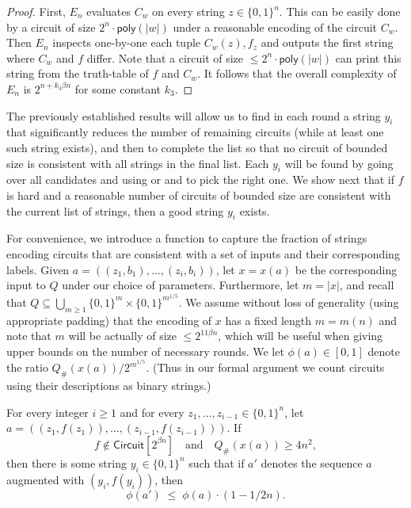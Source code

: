 \documentclass{toc}
\begin{document}
\begin{proof}
First, $E_n$ evaluates $C_w$ on every string $z \in \{0,1\}^n$. This can be easily done by a circuit of size $2^n \cdot \mathsf{poly}(|w|)$ under a reasonable encoding of the circuit $C_w$. Then $E_n$ inspects one-by-one each tuple $C_w(z), f_z$ and outputs the first string where $C_w$ and $f$ differ. Note that a circuit of size $\leq 2^n \cdot \mathsf{poly}(|w|)$ can print this string from the truth-table of $f$ and $C_w$. It follows that the overall complexity of $E_n$ is $2^{n + k_3 \beta n}$ for some constant $k_3$. 
\end{proof}

The previously established results will allow us to find in each round a string $y_i$ that significantly reduces the number of remaining circuits (while at least one such string exists), and then to complete the list so that no circuit of bounded size is consistent with all strings in the final list. Each $y_i$ will be found by going over all candidates and using  or  and  to pick the right one. We show next that if $f$ is hard and a reasonable number of circuits of bounded size are consistent with the current list of strings, then a good string $y_i$ exists.

For convenience, we introduce a function to capture the fraction of strings encoding circuits that are consistent with a set of inputs and their corresponding labels. Given $a = ((z_1, b_1), \ldots, (z_i, b_i))$, let $x = x(a)$ be the corresponding input to $Q$ under our choice of parameters. Furthermore, let $m = |x|$, and recall that $Q \subseteq \bigcup_{m \geq 1} \{0,1\}^m \times \{0,1\}^{m^{1/5}}$. 
We assume without loss of generality (using appropriate padding) that the encoding of $x$ has a fixed length $m = m(n)$ and note that $m$ will be actually of size $\le 2^{11 \beta n}$, which will be useful when
%
giving upper bounds on %
the number of necessary rounds.  We let $\phi(a) \in [0,1]$ denote the ratio $Q_{\#}(x(a))/2^{m^{1/5}}$. (Thus in our formal argument we count circuits using their descriptions as binary strings.)

\begin{lemma}\label{l:existence_string}
For every integer $i \geq 1$ and for every $z_1, \ldots, z_{i - 1} \in \{0,1\}^n$, let $a = ((z_1, f(z_1)), \ldots, (z_{i-1},f(z_{i-1})))$. If $$f \notin \mathsf{Circuit}[2^{\beta n}] \quad \text{and} \quad Q_{\#}(x(a)) \geq 4n^2,$$ then there is some string $y_i \in \{0,1\}^n$ such that if $a'$ denotes the sequence $a$ augmented with $(y_i, f(y_i))$, then $$\phi(a') \;\leq\; \phi(a) \cdot (1 - 1/2n).$$
\end{lemma}
\end{document}
